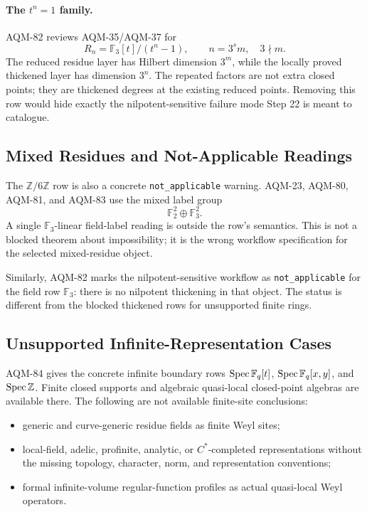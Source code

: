 \paragraph{The \(t^n=1\) family.}
AQM-82 reviews AQM-35/AQM-37 for
\[
  R_n=\mathbb F_3[t]/(t^n-1),\qquad n=3^s m,\quad 3\nmid m .
\]
The reduced residue layer has Hilbert dimension \(3^m\), while the locally
proved thickened layer has dimension \(3^n\).  The repeated factors are not
extra closed points; they are thickened degrees at the existing reduced
points.  Removing this row would hide exactly the nilpotent-sensitive
failure mode Step 22 is meant to catalogue.

\subsection{Mixed Residues and Not-Applicable Readings}

The \(\mathbb Z/6\mathbb Z\) row is also a concrete
\texttt{not\_applicable} warning.  AQM-23, AQM-80, AQM-81, and AQM-83 use
the mixed label group
\[
  \mathbb F_2^2\oplus\mathbb F_3^2 .
\]
A single \(\mathbb F_3\)-linear field-label reading is outside the row's
semantics.  This is not a blocked theorem about impossibility; it is the
wrong workflow specification for the selected mixed-residue object.

Similarly, AQM-82 marks the nilpotent-sensitive workflow as
\texttt{not\_applicable} for the field row \(\mathbb F_3\): there is no
nilpotent thickening in that object.  The status is different from the
blocked thickened rows for unsupported finite rings.

\subsection{Unsupported Infinite-Representation Cases}

AQM-84 gives the concrete infinite boundary rows
\(\operatorname{Spec}\mathbb F_q[t]\), \(\operatorname{Spec}\mathbb F_q[x,y]\), and \(\operatorname{Spec}\mathbb Z\).
Finite closed supports and algebraic quasi-local closed-point algebras are
available there.  The following are not available finite-site conclusions:

\begin{itemize}
\item generic and curve-generic residue fields as finite Weyl sites;
\item local-field, adelic, profinite, analytic, or \(C^*\)-completed
  representations without the missing topology, character, norm, and
  representation conventions;
\item formal infinite-volume regular-function profiles as actual
  quasi-local Weyl operators.
\end{itemize}

